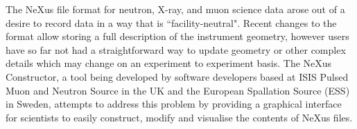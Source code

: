 The NeXus file format for neutron, X-ray, and muon science data arose out of a desire to record data in a way that is ``facility-neutral". Recent changes to the format allow storing a full description of the instrument geometry, however users have so far not had a straightforward way to update geometry or other complex details which may change on an experiment to experiment basis. The NeXus Constructor, a tool being developed by software developers based at ISIS Pulsed Muon and Neutron Source in the UK and the European Spallation Source (ESS) in Sweden, attempts to address this problem by providing a graphical interface for scientists to easily construct, modify and visualise the contents of NeXus files.
